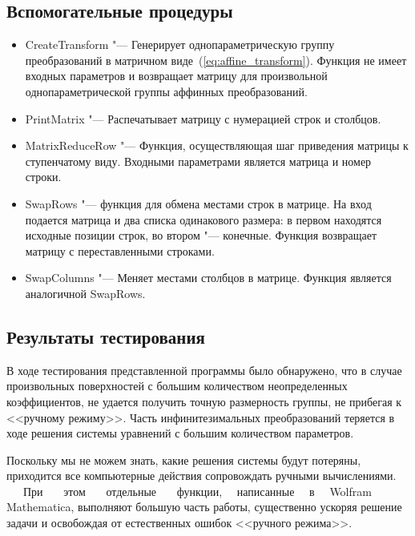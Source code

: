 \documentclass[../main.tex]{subfiles}
\begin{document}
\subsection{Вспомогательные процедуры}
\begin{itemize}
\item {\ttfamily CreateTransform} "--- Генерирует однопараметрическую группу преобразований в матричном виде~(\ref{eq:affine_transform}). Функция не имеет входных параметров и возвращает матрицу для произвольной однопараметрической группы аффинных преобразований.

\item {\ttfamily PrintMatrix} "--- Распечатывает матрицу с нумерацией строк и столбцов.

\item {\ttfamily MatrixReduceRow} "--- Функция, осуществляющая шаг приведения матрицы к ступенчатому виду. Входными параметрами является матрица и номер строки.

\item {\ttfamily SwapRows} "--- функция для обмена местами строк в матрице. На вход подается матрица и два списка одинакового размера: в первом находятся исходные позиции строк, во втором "--- конечные. Функция возвращает матрицу с переставленными строками.

\item {\ttfamily SwapColumns} "--- Меняет местами столбцов в матрице. Функция является аналогичной {\ttfamily SwapRows}.

\end{itemize}

\subsection{Результаты тестирования}
В ходе тестирования представленной программы было обнаружено, что в случае произвольных поверхностей с большим количеством неопределенных коэффициентов, не удается получить точную размерность группы, не прибегая к <<ручному режиму>>. Часть инфинитезимальных преобразований теряется в ходе решения системы уравнений с большим количеством параметров.

Поскольку мы не можем знать, какие решения системы будут потеряны, приходится все компьютерные действия сопровождать ручными вычислениями. ~~~При ~~~этом ~~~отдельные ~~~функции, ~~написанные ~~в ~~{\ttfamily Wolfram\\ Mathematica}, выполняют большую часть работы, существенно ускоряя решение задачи и освобождая от естественных ошибок <<ручного режима>>.
\end{document}
